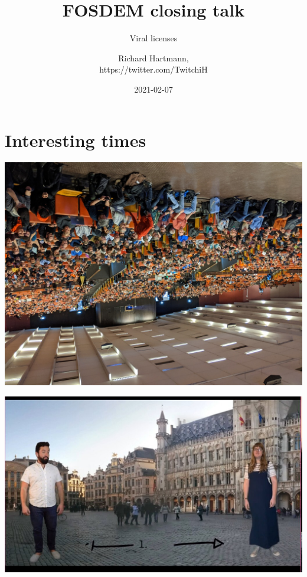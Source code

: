 \documentclass[aspectratio=169]{beamer}
\title{FOSDEM closing talk}
\subtitle{Viral licenses}
\author{Richard Hartmann,\\
https://twitter.com/TwitchiH}
\date{2021-02-07}
\begin{document}
\setcounter{tocdepth}{1}

\begin{frame}
	\titlepage
\end{frame}

\section{Interesting times}


\begin{frame}
	\begin{center}
	\vfill
		\includegraphics[scale=0.25]{images/closing_2020.jpg}
	\vfill
	\end{center}
\end{frame}

\begin{frame}
	\begin{center}
	\vfill
		\includegraphics[scale=0.25]{images/fosdem_home_4_768.jpg}
	\vfill
	\end{center}
\end{frame}
\end{document}
